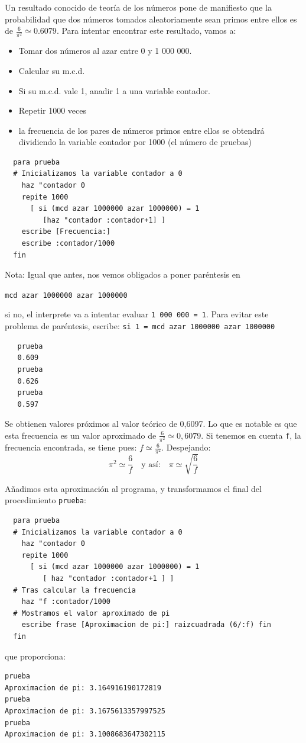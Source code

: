 \documentclass[12pt,twoside,spanish,a4paper]{report}
\begin{document}
Un resultado conocido de teor\'ia de los n\'umeros pone de manifiesto
que la probabilidad que dos n\'umeros tomados aleatoriamente sean primos
entre ellos es de $\frac{6}{\pi^2} \simeq 0.6079$. Para intentar
encontrar este resultado, vamos a:
\begin{itemize}
   \item Tomar dos n\'umeros al azar entre 0 y 1 000 000.
   \item Calcular su m.c.d.
   \item Si su m.c.d. vale 1, anadir 1 a una variable contador.
   \item Repetir 1000 veces
   \item la frecuencia de los pares de n\'umeros primos entre ellos se obtendr\'a
      dividiendo la variable contador por 1000 (el n\'umero de pruebas)
\end{itemize}
\begin{verbatim}
  para prueba
  # Inicializamos la variable contador a 0
    haz "contador 0
    repite 1000
      [ si (mcd azar 1000000 azar 1000000) = 1
         [haz "contador :contador+1] ]
    escribe [Frecuencia:]
    escribe :contador/1000
  fin  \end{verbatim}

Nota: Igual que antes, nos vemos obligados a poner par\'entesis en

\texttt{mcd azar 1000000 azar 1000000}

si no, el interprete va a intentar evaluar \texttt{1 000 000 = 1}. Para evitar
este problema de par\'entesis, escribe:
\texttt{si 1 = mcd azar 1000000 azar 1000000}
\begin{verbatim}
   prueba
   0.609
   prueba
   0.626
   prueba
   0.597\end{verbatim}

Se obtienen valores pr\'oximos al valor te\'orico de 0,6097. Lo que
es notable es que esta frecuencia es un valor aproximado de 
$\displaystyle \frac{6}{\pi^2} \simeq 0,6079$.
Si tenemos en cuenta \texttt{f}, la frecuencia encontrada, se tiene pues:
$f\simeq\frac{6}{\pi^{2}}$. Despejando:
\[ \pi^2 \simeq \frac{6}{f} \quad \textrm{y as\'i:} \quad
   \pi \simeq \sqrt{\frac{6}{f}} \]

A\~nadimos esta aproximaci\'on al programa, y transformamos el final del
procedimiento \texttt{prueba}:
\begin{verbatim}
  para prueba
  # Inicializamos la variable contador a 0
    haz "contador 0
    repite 1000
      [ si (mcd azar 1000000 azar 1000000) = 1
         [ haz "contador :contador+1 ] ]
  # Tras calcular la frecuencia
    haz "f :contador/1000
  # Mostramos el valor aproximado de pi
    escribe frase [Aproximacion de pi:] raizcuadrada (6/:f) fin
  fin  \end{verbatim}
\noindent que proporciona:
\begin{verbatim}
prueba
Aproximacion de pi: 3.164916190172819
prueba
Aproximacion de pi: 3.1675613357997525
prueba
Aproximacion de pi: 3.1008683647302115 \end{verbatim}
\end{document}
